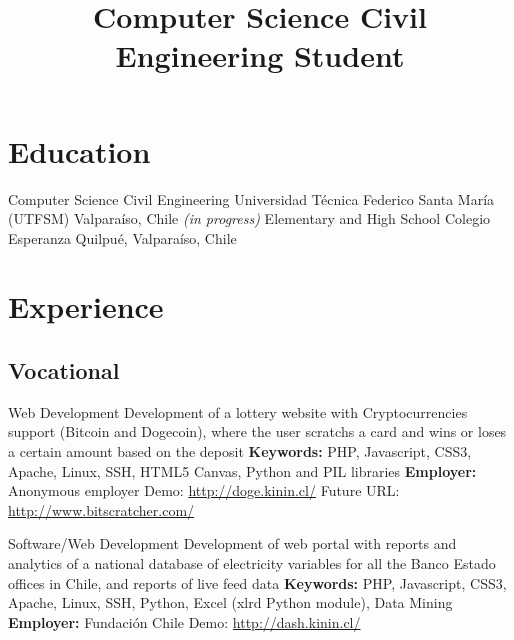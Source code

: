 \documentclass[11pt,a4paper,sans]{moderncv}
\title{Computer Science Civil Engineering Student}
\begin{document}
\maketitle




\section{Education}

        {Computer Science Civil Engineering}
        {Universidad Técnica Federico Santa María (UTFSM)}
        {Valparaíso, Chile}
        {\emph{(in progress)}}
        {}
        {Elementary and High School}
        {Colegio Esperanza}
        {Quilpué, Valparaíso, Chile}
        {}{}

\section{Experience}
\subsection{Vocational}

        {Web Development}
        {Development of a lottery website with Cryptocurrencies support (Bitcoin and Dogecoin), where the user scratchs a card and wins or loses a certain amount based on the deposit}
        {\textbf{Keywords:} PHP, Javascript, CSS3, Apache, Linux, SSH, HTML5 Canvas, Python and PIL libraries}
        {\textbf{Employer:} Anonymous employer}
        {Demo: \url{http://doge.kinin.cl/} Future URL: \url{http://www.bitscratcher.com/}}

        {Software/Web Development}
        {Development of web portal with reports and analytics of a national database of electricity variables for all the Banco Estado offices in Chile, and reports of live feed data}
        {\textbf{Keywords:} PHP, Javascript, CSS3, Apache, Linux, SSH, Python, Excel (xlrd Python module), Data Mining}
        {\textbf{Employer:} Fundación Chile}
        {Demo: \url{http://dash.kinin.cl/}}
\end{document}
